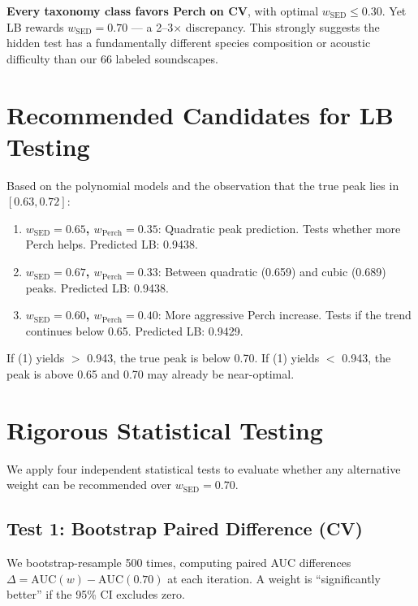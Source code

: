 \documentclass[a4paper,11pt]{article}
\begin{document}
\textbf{Every taxonomy class favors Perch on CV}, with optimal $w_\text{SED} \leq 0.30$.
Yet LB rewards $w_\text{SED} = 0.70$ --- a 2--3$\times$ discrepancy.
This strongly suggests the hidden test has a fundamentally different species composition or acoustic difficulty than our 66 labeled soundscapes.

\section{Recommended Candidates for LB Testing}

Based on the polynomial models and the observation that the true peak lies in $[0.63, 0.72]$:

\begin{enumerate}
\item \textbf{$w_\text{SED} = 0.65$, $w_\text{Perch} = 0.35$}: Quadratic peak prediction. Tests whether more Perch helps. Predicted LB: 0.9438.
\item \textbf{$w_\text{SED} = 0.67$, $w_\text{Perch} = 0.33$}: Between quadratic (0.659) and cubic (0.689) peaks. Predicted LB: 0.9438.
\item \textbf{$w_\text{SED} = 0.60$, $w_\text{Perch} = 0.40$}: More aggressive Perch increase. Tests if the trend continues below 0.65. Predicted LB: 0.9429.
\end{enumerate}

If (1) yields $>$ 0.943, the true peak is below 0.70. If (1) yields $<$ 0.943, the peak is above 0.65 and 0.70 may already be near-optimal.

\section{Rigorous Statistical Testing}

We apply four independent statistical tests to evaluate whether any alternative weight can be recommended over $w_\text{SED}=0.70$.

\subsection{Test 1: Bootstrap Paired Difference (CV)}

We bootstrap-resample 500 times, computing paired AUC differences $\Delta = \text{AUC}(w) - \text{AUC}(0.70)$ at each iteration. A weight is ``significantly better'' if the 95\% CI excludes zero.
\end{document}
